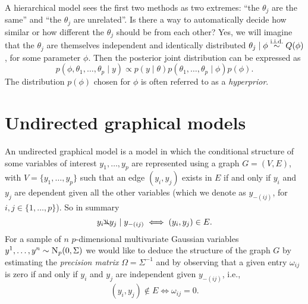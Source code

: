 \documentclass[a4paper, 11pt, oneside]{report}
\newcommand{\iid}{\stackrel{\textmd{i.i.d.}}{\sim}}
\newcommand{\1}{\mathds{1}}
\newcommand{\inv}{^{-1}}
\newcommand{\Np}{\textsc{N}_p}
\newcommand{\nindep}{{\rotatebox[origin=c]{90}{$\nvDash$}}}
\begin{document}
A hierarchical model sees the first two methods as two
extremes: ``the $\theta_j$ are the same'' and ``the $\theta_j$ are unrelated''.
Is there a way to automatically decide how similar or how different the $\theta_j$ should be from each other?
Yes, we will imagine that the $\theta_j$ are themselves independent and identically distributed
$\theta_j \mid \phi \iid Q(\phi)$, for some parameter $\phi$. Then the posterior
joint distribution can be expressed as
\[p(\phi, \theta_1, \dots, \theta_p \mid y) \propto p(y \mid \theta) p(\theta_1, \dots, \theta_p \mid \phi) p(\phi).\]
The distribution $p(\phi)$ chosen for $\phi$ is often
referred to as a \emph{hyperprior}.

\section{Undirected graphical models}
An undirected graphical model is a model in which the conditional
structure of some variables of interest $y_1, \dots, y_p$ are represented using a
graph $G=(V, E)$, with $V = \{y_1, \dots, y_p\}$ such that an edge $(y_i, y_j)$
exists in $E$ if and only if $y_i$ and $y_j$ are dependent given all the other
variables (which we denote as $y_{-(ij)}$, for $i,j \in \{1,\dots,p\}$). So in summary
\[y_i \nindep y_j \mid y_{-(ij)} \iff (y_i, y_j) \in E.\]
For a sample
of $n$ $p$-dimensional multivariate Gaussian variables $y^1, \dots, y^n \sim
	\Np(0, \Sigma)$ we would like to deduce the structure of the graph $G$ by
estimating the \emph{precision matrix} $\Omega =
	\Sigma\inv$ and by observing that a given entry $\omega_{ij}$ is zero if and only if $y_i$ and $y_j$ are
independent given $y_{-(ij)}$, i.e.,
\[(y_i, y_j) \notin E \iff \omega_{ij} = 0.\]
\end{document}

